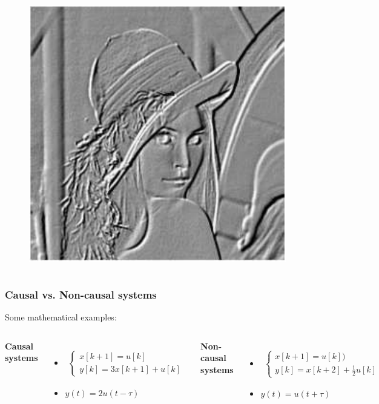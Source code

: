 \documentclass{beamer}
\begin{document}
\begin{frame}
\begin{columns}
\begin{figure}
\includegraphics[width=.5\linewidth]{highlight}
\end{figure}
\vspace{-4ex}

\end{columns}
\end{frame}


\begin{frame}
\frametitle{Causal vs. Non-causal systems}
\vspace{-6ex}
Some mathematical examples:\\
\bigskip
\begin{columns}
\textbf{Causal systems}\\
\begin{itemize}
\item \begin{align*}
\begin{cases}
x[k+1] = u[k]\\
y[k] = 3 x [k+1] + u[k]
\end{cases}
\end{align*}
\item $y(t) = 2 u(t-\tau)$
\end{itemize}

\textbf{Non-causal systems}\\
\begin{itemize}
\item \begin{align*}
\begin{cases}
x[k+1] = u[k])\\
y[k] = x[k+2] + \frac{1}{2}u[k]
\end{cases}
\end{align*}
\item $y(t) = u(t + \tau)$
\end{itemize}

\end{columns}
\end{frame}
\end{document}
